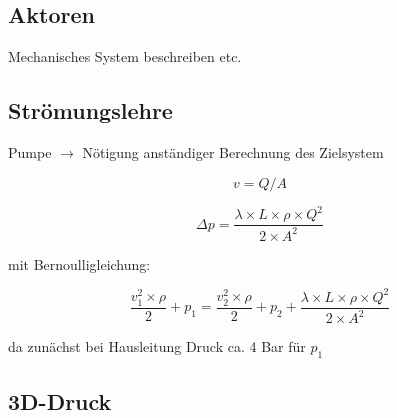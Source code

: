 \subsection{Aktoren}

Mechanisches System beschreiben etc.

\subsection{Strömungslehre}

Pumpe $\rightarrow$ Nötigung anständiger Berechnung des Zielsystem

\begin{equation} \label{v_qa}
    v = Q/A
\end{equation}

\begin{equation}\label{Rohreibung}
    \Delta p = \frac{\lambda \times L \times \rho \times Q^2}{2 \times A^2}
\end{equation}

mit Bernoulligleichung:

\begin{equation}
    \frac{v_{1}^2 \times \rho}{2} + p_1 = \frac{v_{2}^2 \times \rho}{2} + p_2 + \frac{\lambda \times L \times \rho \times Q^2}{2 \times A^2}
\end{equation}

da zunächst bei Hausleitung Druck ca. 4 Bar für $p_1$

\subsection{3D-Druck}
